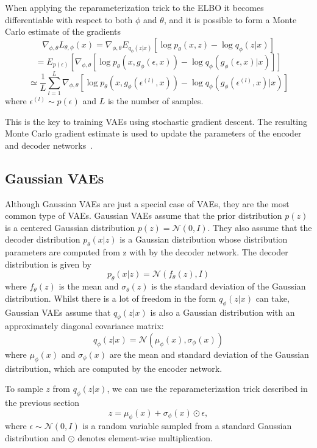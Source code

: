 When applying the reparameterization trick to the ELBO it becomes differentiable with respect to both $\phi$ and $\theta$, and it is possible to form a Monte Carlo estimate of the gradients
\[ \nabla_{\phi, \theta} L_{\theta, \phi}(x) = \nabla_{\phi, \theta} E_{q_{\phi}(z|x)} [\log p_{\theta}(x, z) - \log q_{\phi}(z|x)] \]
\[ = E_{p(\epsilon)}[\nabla_{\phi, \theta} [\log p_{\theta}(x, g_{\phi}(\epsilon, x)) - \log q_{\phi}(g_{\phi}(\epsilon, x)|x)]] \]
\[  \simeq \frac{1}{L} \sum_{l=1}^{L} \nabla_{\phi, \theta} [\log p_{\theta}(x, g_{\phi}(\epsilon^{(l)}, x)) - \log q_{\phi}(g_{\phi}(\epsilon^{(l)}, x)|x)] \]
where $\epsilon^{(l)} \sim p(\epsilon)$ and $L$ is the number of samples.

This is the key to training VAEs using stochastic gradient descent. The resulting Monte Carlo gradient estimate is used to update the parameters of the encoder and decoder networks~\cite{Kingma_2019}.


\subsection{Gaussian VAEs}

Although Gaussian VAEs are just a special case of VAEs, they are the most common type of VAEs. Gaussian VAEs assume that the prior distribution $p(z)$ is a centered Gaussian distribution $ p(z) = \mathcal{N}(0, I)$. They also assume that the decoder distribution $p_{\theta}(x|z)$ is a Gaussian distribution whose distribution parameters are computed from z with by the decoder network. The decoder distribution is given by
\[ p_{\theta}(x|z) = \mathcal{N}(f_{\theta}(z), I) \]
where $f_{\theta}(z)$ is the mean and $\sigma_{\theta}(z)$ is the standard deviation of the Gaussian distribution. Whilst there is a lot of freedom in the form $q_{\phi}(z|x)$ can take, Gaussian VAEs assume that $q_{\phi}(z|x)$ is also a Gaussian distribution with an approximately diagonal covariance matrix: 
\[ q_{\phi}(z|x) = \mathcal{N}(\mu_{\phi}(x), \sigma_{\phi}(x)) \]
where $\mu_{\phi}(x)$ and $\sigma_{\phi}(x)$ are the mean and standard deviation of the Gaussian distribution, which are computed by the encoder network.

To sample $z$ from $q_{\phi}(z|x)$, we can use the reparameterization trick described in the previous section
\[ z = \mu_{\phi}(x) + \sigma_{\phi}(x) \odot \epsilon, \] 
where $\epsilon \sim \mathcal{N}(0, I)$ is a random variable sampled from a standard Gaussian distribution and $\odot$ denotes element-wise multiplication.

